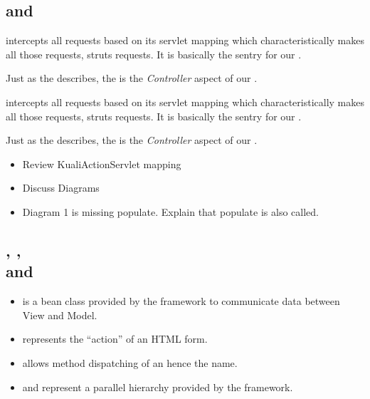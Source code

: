 \begin{ifhtml}
  \begin{s5slide}
    \section{ and \\ }
     intercepts all requests based on its servlet mapping which characteristically makes all those
    requests, struts requests. It is basically the sentry for our \MVC .

    Just as the  describes, the  is the \emph{Controller} aspect of our
    \MVC .
    \begin{slideshow}
      \item {}
      \item {}
    \end{slideshow}
    \begin{s5notes}
       intercepts all requests based on its servlet mapping which characteristically makes all those
      requests, struts requests. It is basically the sentry for our \MVC .
      
      Just as the  describes, the  is the \emph{Controller} aspect of our
      \MVC .

      \begin{itemize}
        \item Review KualiActionServlet mapping
        \item Discuss Diagrams
        \item Diagram 1 is missing populate. Explain that populate is also called.
      \end{itemize}
    \end{s5notes}
  \end{s5slide}

  \begin{s5slide}
    \section{, , \\ and }

    \begin{itemize}
      \item {} is a bean class provided by the framework to communicate data between View and Model.
      \item {} represents the ``action'' of an HTML form.
      \item {} allows method dispatching of an  hence the name.
      \item {} and  represent a parallel hierarchy provided by the framework.
    \end{itemize}


\end{s5slide}
\end{ifhtml}
